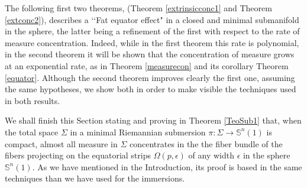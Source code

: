 \documentclass[11pt,letterpaper]{amsart}
\theoremstyle{definition}
\theoremstyle{remark}
\newcommand{\ese}{\mathbb{S}}
\begin{document}
The following first two  theorems, (Theorem \ref{extrinsicconc1} and Theorem \ref{extconc2}), describes a \lq\lq Fat equator effect" in a closed and minimal submanifold in the sphere, the latter being a refinement of the first with respect to the rate of measure concentration. Indeed, while in the first theorem this rate is polynomial, in the second theorem it will be shown that the concentration of measure grows at an exponential rate, as in Theorem \ref{measurecon} and its corollary  Theorem \ref{equator}. Although the second theorem improves clearly the first one, assuming the same hypotheses, we show both in order to make visible the techniques used in both results.

We shall finish this Section stating and proving in Theorem \ref{TeoSub1}  that, when the total space $\Sigma$ in a minimal Riemannian submersion $\pi: \Sigma \rightarrow \ese^n(1)$ is compact, almost all measure in $\Sigma$ concentrates in the the fiber bundle of the fibers projecting on the equatorial strips $\Omega(p, \epsilon)$ of any width $\epsilon$ in the sphere $\ese^n(1)$. As we have mentioned in the Introduction, its proof is based in the same techniques than we have used for the immersions.
\end{document}
